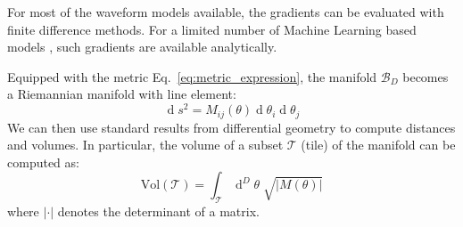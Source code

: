 \documentclass[twocolumn,showpacs,preprintnumbers,nofootinbib,prd,
superscriptaddress,10pt]{revtex4-2}
\renewcommand{\d}[1]{\ensuremath{\operatorname{d}\!{#1}}}
\newcommand{\dvol}[2]{\ensuremath{\operatorname{d}^{#2}\!{#1}}}
\begin{document}
For most of the waveform models available, the gradients can be evaluated with finite difference methods. For a limited number of Machine Learning based models \cite{Khan:2020fso, PhysRevD.103.043020, ML_wf_model, Tissino:2022thn}, such gradients are available analytically.


Equipped with the metric Eq.~\eqref{eq:metric_expression}, the manifold $\mathcal{B}_D$ becomes a Riemannian manifold with line element:
\begin{equation}\label{eq:line_element}
	\d{s^2} = M_{ij}(\theta) \d{\theta_i} \d{\theta_j}
\end{equation}
We can then use standard results from differential geometry to compute distances and volumes. In particular, the volume of a subset $\mathcal{T}$ (tile) of the manifold can be computed as:
\begin{equation}\label{eq:volume_tile}
	\text{Vol}(\mathcal{T}) = \int_\mathcal{T} \dvol{\theta}{D} \; \sqrt{|M(\theta)|}
\end{equation}
where $|\cdot|$ denotes the determinant of a matrix.
\end{document}
